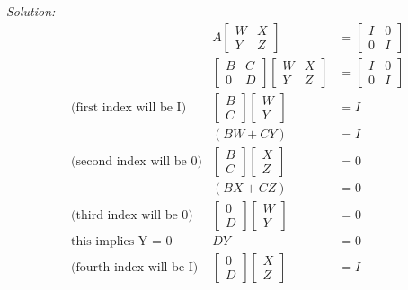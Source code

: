 \documentclass{article}
\newenvironment{solution}
    {\textit{Solution:}}
    {}
\begin{document}
\begin{solution}
\begin{align*}
    && A \begin{bmatrix} W & X \\ Y & Z \end{bmatrix} &= \begin{bmatrix} I & 0 \\ 0 & I \end{bmatrix}\\
    &&\begin{bmatrix} B & C \\ 0 & D \end{bmatrix} \begin{bmatrix} W & X \\ Y & Z \end{bmatrix} &= \begin{bmatrix} I & 0 \\ 0 & I \end{bmatrix}\\
    &\text{(first index will be I)} & \begin{bmatrix} B \\ C \end{bmatrix}\begin{bmatrix} W \\ Y \end{bmatrix} &= I \\
    && (BW + CY) &= I\\
    &\text{(second index will be 0)} & \begin{bmatrix} B \\ C \end{bmatrix}\begin{bmatrix} X \\ Z \end{bmatrix} &= 0 \\
    && (BX + CZ) &= 0 \\
    &\text{(third index will be 0)} & \begin{bmatrix} 0 \\ D \end{bmatrix}\begin{bmatrix} W\\ Y \end{bmatrix} &= 0 \\
    &\text{this implies Y = 0}& DY &= 0 \\
    &\text{(fourth index will be I)} & \begin{bmatrix} 0 \\ D \end{bmatrix}\begin{bmatrix} X\\ Z \end{bmatrix} &= I \\

\end{align*}
\end{solution}
\end{document}
